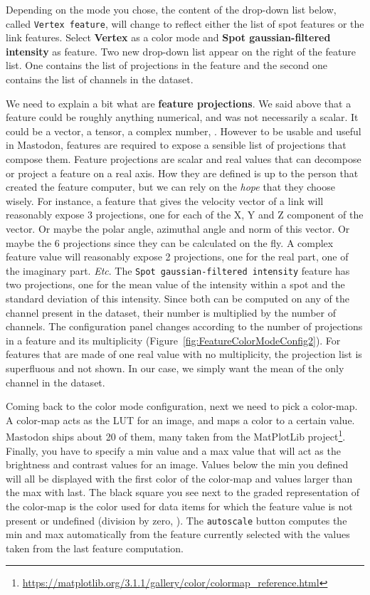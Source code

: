 \noindent Depending on the mode you chose, the content of the drop-down list below, called \texttt{Vertex feature}, will change to reflect either the list of spot features or the link features.
Select \textbf{Vertex} as a color mode and \textbf{Spot gaussian-filtered intensity} as feature.
Two new drop-down list appear on the right of the feature list. 
One contains the list of projections in the feature and the second one contains the list of channels in the dataset. 

We need to explain a bit what are \textbf{feature projections}.
We said above that a feature could be roughly anything numerical, and was not necessarily a scalar. 
It could be a vector, a tensor, a complex number, \etc.
However to be usable and useful in Mastodon, features are required to expose a sensible list of projections that compose them.
Feature projections are scalar and real values that can decompose or project a feature on a real axis.
How they are defined is up to the person that created the feature computer, but we can rely on the \textit{hope} that they choose wisely. 
For instance, a feature that gives the velocity vector of a link will reasonably expose 3 projections, one for each of the X, Y and Z component of the vector. 
Or maybe the polar angle, azimuthal angle and norm of this vector.
Or maybe the 6 projections since they can be calculated on the fly. 
A complex feature value will reasonably expose 2 projections, one for the real part, one of the imaginary part.
\textit{Etc}.
The \texttt{Spot gaussian-filtered intensity} feature has two projections, one for the mean value of the intensity within a spot and the standard deviation of this intensity.
Since both can be computed on any of the channel present in the dataset, their number is multiplied by the number of channels. 
The configuration panel changes according to the number of projections in a feature and its multiplicity (Figure~\ref{fig:FeatureColorModeConfig2}). 
For features that are made of one real value with no multiplicity, the projection list is superfluous and not shown.
In our case, we simply want the mean of the only channel in the dataset.

Coming back to the color mode configuration, next we need to pick a color-map.
A color-map acts as the LUT for an image, and maps a color to a certain value. 
Mastodon ships about 20 of them, many taken from the MatPlotLib project\footnote{\url{https://matplotlib.org/3.1.1/gallery/color/colormap_reference.html}}.
Finally, you have to specify a min value and a max value that will act as the brightness and contrast values for an image.
Values below the min you defined will all be displayed with the first color of the color-map and values larger than the max with last.
The black square you see next to the graded representation of the color-map is the color used for data items for which the feature value is not present or undefined (division by zero, \etc).
The \texttt{autoscale} button computes the min and max automatically from the feature currently selected with the values taken from the last feature computation.

